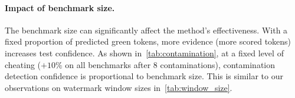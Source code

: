 \paragraph{\textbf{Impact of benchmark size.}} The benchmark size can significantly affect the method's effectiveness.
With a fixed proportion of predicted green tokens, more evidence (\ie more scored tokens) increases test confidence. 
As shown in~\autoref{tab:contamination}, at a fixed level of cheating (\eg $+10\%$ on all benchmarks after $8$ contaminations), contamination detection confidence is proportional to benchmark size.
This is similar to our observations on watermark window sizes in~\autoref{tab:window_size}.







\vspace{-0.1cm}
